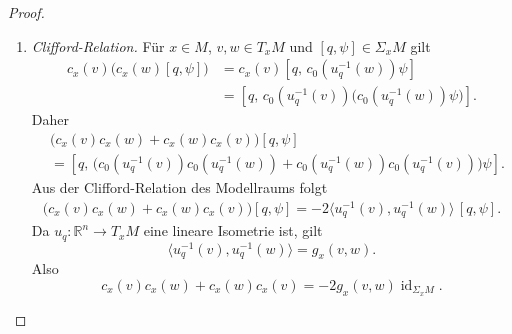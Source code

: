 \documentclass[10pt, letterpaper]{article}
\newcommand{\id}{\operatorname{id}}
\newcommand{\R}{\mathbb{R}}
\newcommand{\Spin}{\mathrm{Spin}}
\begin{document}
\begin{proof}
\begin{enumerate}
    Zur Prüfung der Glattheit wählen wir auf einer offenen Menge $U\subset M$ einen glatten
    lokalen Schnitt
    \[
    s:U\to P^{\Spin}(M).
    \]
    Da
    \[
    TM\cong P^{\Spin}\times_\lambda \R^n,
    \qquad
    \Sigma M\cong P^{\Spin}\times_\rho \Sigma_n,
    \]
    induziert $s$ Bündelisomorphismen
    \[
    \Phi_s^{TM}:U\times \R^n\to TM|_U,
    \qquad
    (x,\xi)\mapsto [s(x),\xi],
    \]
    \[
    \Phi_s^{\Sigma}:U\times \Sigma_n\to \Sigma M|_U,
    \qquad
    (x,\psi)\mapsto [s(x),\psi].
    \]
    Damit erhält man eine lokale Darstellung
    \[
    \widetilde c_s
    :=
    (\Phi_s^\Sigma)^{-1}\circ c\circ (\Phi_s^{TM}\times_U \Phi_s^\Sigma)
    :
    U\times \R^n\times \Sigma_n\to U\times \Sigma_n.
    \]
    Für $(x,\xi,\psi)\in U\times \R^n\times \Sigma_n$ gilt wegen der Definition von $c$:
    \[
    \begin{aligned}
    \widetilde c_s(x,\xi,\psi)
    &=
    (\Phi_s^\Sigma)^{-1}\bigl(c([s(x),\xi],[s(x),\psi])\bigr)\\
    &=
    (\Phi_s^\Sigma)^{-1}\bigl([s(x),c_0(\xi)\psi]\bigr)\\
    &=
    (x,c_0(\xi)\psi).
    \end{aligned}
    \]
    In diesen lokalen Trivialisierungen wird $c$ also durch
    \[
    (x,\xi,\psi)\mapsto (x,c_0(\xi)\psi)
    \]
    beschrieben. Da $c_0$ bilinear und damit glatt ist, ist auch die lokale Darstellung
    glatt. Ist die Clifford-Multiplikation eine glatte Bündelabbildung.
    \item \emph{Clifford-Relation.}
    Für $x\in M$, $v,w\in T_xM$ und $[q,\psi]\in \Sigma_xM$ gilt
    \[
    \begin{aligned}
    c_x(v)\bigl(c_x(w)[q,\psi]\bigr)
    &=
    c_x(v)[q,\,c_0(u_q^{-1}(w))\psi] \\
    &=
    [q,\,c_0(u_q^{-1}(v))\bigl(c_0(u_q^{-1}(w))\psi\bigr)].
    \end{aligned}
    \]
    Daher
    \[
    \begin{aligned}
    &\bigl(c_x(v)c_x(w)+c_x(w)c_x(v)\bigr)[q,\psi] \\
    &=
    [q,\,
    \bigl(c_0(u_q^{-1}(v))c_0(u_q^{-1}(w))
    +c_0(u_q^{-1}(w))c_0(u_q^{-1}(v))\bigr)\psi].
    \end{aligned}
    \]
    Aus der Clifford-Relation des Modellraums folgt
    \[
    \begin{aligned}
    \bigl(c_x(v)c_x(w)+c_x(w)c_x(v)\bigr)[q,\psi] =-2\langle u_q^{-1}(v),u_q^{-1}(w)\rangle\,[q,\psi].
    \end{aligned}
    \]
    Da $u_q:\R^n\to T_xM$ eine lineare Isometrie ist, gilt
    \[
    \langle u_q^{-1}(v),u_q^{-1}(w)\rangle=g_x(v,w).
    \]
    Also
    \[
    c_x(v)c_x(w)+c_x(w)c_x(v)
    =
    -2g_x(v,w)\id_{\Sigma_xM}.
    \]

\end{enumerate}
\end{proof}
\end{document}
